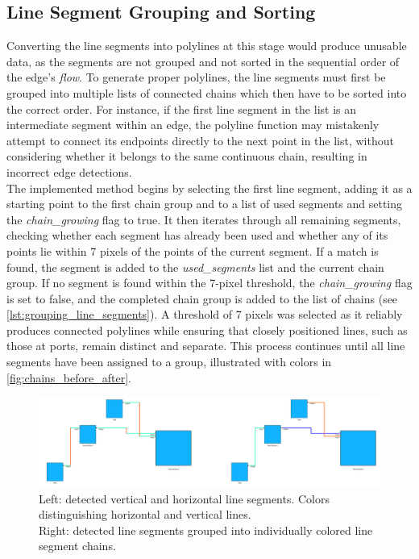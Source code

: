 \subsection{Line Segment Grouping and Sorting}
Converting the line segments into polylines at this stage would produce unusable data, as the segments are not grouped and not sorted in the sequential order of the edge's \textit{flow}. To generate proper polylines, the line segments must first be grouped into multiple lists of connected chains which then have to be sorted into the correct order. For instance, if the first line segment in the list is an intermediate segment within an edge, the polyline function may mistakenly attempt to connect its endpoints directly to the next point in the list, without considering whether it belongs to the same continuous chain, resulting in incorrect edge detections.\\
The implemented method begins by selecting the first line segment, adding it as a starting point to the first chain group and to a list of used segments and setting the \textit{chain\_growing} flag to true. It then iterates through all remaining segments, checking whether each segment has already been used and whether any of its points lie within 7 pixels of the points of the current segment. If a match is found, the segment is added to the \textit{used\_segments} list and the current chain group. If no segment is found within the 7-pixel threshold, the \textit{chain\_growing} flag is set to false, and the completed chain group is added to the list of chains (see \autoref{lst:grouping_line_segments}). A threshold of 7 pixels was selected as it reliably produces connected polylines while ensuring that closely positioned lines, such as those at ports, remain distinct and separate. This process continues until all line segments have been assigned to a group, illustrated with colors in \autoref{fig:chains_before_after}.

\begin{figure}[ht]
    \centering
    \includegraphics[width=\linewidth]{pictures/chains_before_after.png}
    \caption[Line segments being grouped into line segment chains]{Left: detected vertical and horizontal line segments. Colors distinguishing horizontal and vertical lines.\\Right: detected line segments grouped into individually colored line segment chains.}
    \label{fig:chains_before_after}
\end{figure}
